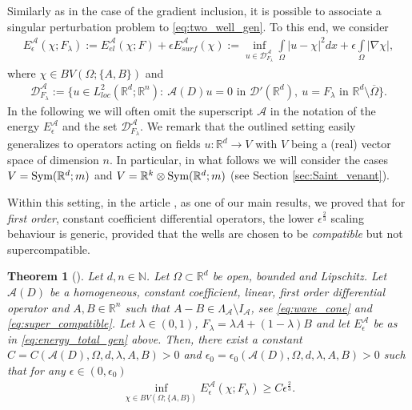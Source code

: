 \documentclass[a4paper, 10pt, twoside, notitlepage]{amsart}
\theoremstyle{plain}
\newtheorem{thm}{Theorem}
\newcommand{\R}{\mathbb{R}}
\newcommand{\N}{\mathbb{N}}
\newcommand{\A}{\mathcal{A}}
\renewcommand{\S}[1]{\textup{Sym}(\R^d;#1)}
\begin{document}
	Similarly as in the case of the gradient inclusion, it is possible to associate a singular perturbation problem to \eqref{eq:two_well_gen}. To this end, we consider
	\begin{align}
		\label{eq:energy_total_gen}
		E_{\epsilon}^{\A}(\chi;F_\lambda):= E_{el}^{\A}(\chi;F) + \epsilon E_{surf}^{\A}(\chi) :=  \inf\limits_{u\in \mathcal{D}_{F_{\lambda}}^{\A}} \int\limits_{\Omega}|u-\chi|^2 dx+ \epsilon \int\limits_{\Omega} |\nabla \chi|,
	\end{align}
	where $\chi \in BV(\Omega; \{A,B\})$ and
	\begin{align}
		\label{eq:admissible_gen}
		\mathcal{D}_{F_{\lambda}}^{\A} := \{u \in L^2_{loc}(\R^d;\R^n): \  \A(D)u = 0  \mbox{ in } \mathcal{D}'(\R^d), \ u= F_{\lambda} \mbox{ in } \R^d \setminus \overline{\Omega}\}.
	\end{align}
	In the following we will often omit the superscript $\A$ in the notation of the energy $E_\epsilon^\A$ and the set $\mathcal{D}_{F_\lambda}^{\A}$.
	We remark that the outlined setting easily generalizes to operators acting on fields $u:\R^d\to V$ with $V$ being a (real) vector space of dimension $n$.
	In particular, in what follows we will consider the cases $V=\S{m}$ and $V=\R^k\otimes\S{m}$ (see Section \ref{sec:Saint_venant}).
	
	
	Within this setting, in the article \cite{RRT22}, as one of our main results, we proved that for \emph{first order}, constant coefficient differential operators, the lower
	$\epsilon^{\frac{2}{3}}$ scaling behaviour is generic, provided that the wells are chosen to be \emph{compatible} but not supercompatible.
	
	
	\begin{thm}[{\cite[Theorem 1]{RRT22}}] \label{thm:FirstOrderScaling}
          Let $d,n \in \N$. Let $\Omega \subset \R^d$ be open, bounded and Lipschitz.  Let $\A(D)$ be a homogeneous, constant coefficient, linear, \emph{first order} differential operator
          and $A,B \in \R^n$ such that $A-B \in \Lambda_{\A} \setminus I_{\A}$, see \eqref{eq:wave_cone} and \eqref{eq:super_compatible}. Let $\lambda \in (0,1)$,
            $F_\lambda = \lambda A + (1-\lambda)B$ and let $E^{\A}_{\epsilon}$ be as in \eqref{eq:energy_total_gen} above. Then, there exist a constant $C=C(\A(D),\Omega,d,\lambda, A, B)>0$ and
          $\epsilon_0 = \epsilon_0(\A(D),\Omega,d,\lambda,A,B)>0$ such that for any $\epsilon \in (0,\epsilon_0)$
		\begin{align*}
			\inf\limits_{\chi \in BV(\Omega;\{A,B\})}  E_{\epsilon}^{\A}(\chi;F_\lambda) \geq C \epsilon^{\frac{2}{3}}.
		\end{align*}
	\end{thm}
	
\end{document}
